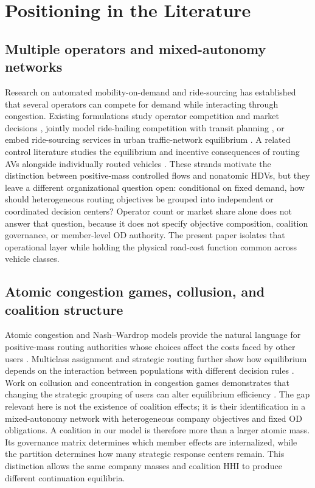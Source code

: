 \section{Positioning in the Literature}\label{sec:related-work}

\subsection{Multiple operators and mixed-autonomy networks}

Research on automated mobility-on-demand and ride-sourcing has established that several operators can compete for demand while interacting through congestion. Existing formulations study operator competition and market decisions \citep{turan2022,wang2022amod}, jointly model ride-hailing competition with transit planning \citep{wei2022}, or embed ride-sourcing services in urban traffic-network equilibrium \citep{xu2021ridesourcing}. A related control literature studies the equilibrium and incentive consequences of routing AVs alongside individually routed vehicles \citep{mehr2019,lazar2021,biyik2021}. These strands motivate the distinction between positive-mass controlled flows and nonatomic HDVs, but they leave a different organizational question open: conditional on fixed demand, how should heterogeneous routing objectives be grouped into independent or coordinated decision centers? Operator count or market share alone does not answer that question, because it does not specify objective composition, coalition governance, or member-level OD authority. The present paper isolates that operational layer while holding the physical road-cost function common across vehicle classes.

\subsection{Atomic congestion games, collusion, and coalition structure}

Atomic congestion and Nash--Wardrop models provide the natural language for positive-mass routing authorities whose choices affect the costs faced by other users \citep{haurie1985,orda1993,harker1988,boulogne2002}. Multiclass assignment and strategic routing further show how equilibrium depends on the interaction between populations with different decision rules \citep{dafermos1972,cominetti2009}. Work on collusion and concentration in congestion games demonstrates that changing the strategic grouping of users can alter equilibrium efficiency \citep{hayrapetyan2006,roughgarden2002}. The gap relevant here is not the existence of coalition effects; it is their identification in a mixed-autonomy network with heterogeneous company objectives and fixed OD obligations. A coalition in our model is therefore more than a larger atomic mass. Its governance matrix determines which member effects are internalized, while the partition determines how many strategic response centers remain. This distinction allows the same company masses and coalition HHI to produce different continuation equilibria.

